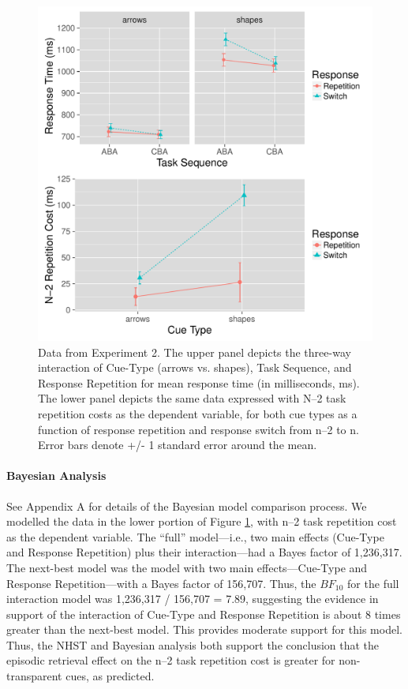 \documentclass[a4paper, doc, natbib]{apa6}
\begin{document}
\begin{figure}
\begin{center}
\includegraphics[width = \textwidth]{Images/all_rts_Experiment2.pdf}
\caption{Data from Experiment 2. The upper panel depicts the three-way interaction of Cue-Type (arrows vs. shapes), Task Sequence, and Response Repetition for mean response time (in milliseconds, ms). The lower panel depicts the same data expressed with N--2 task repetition costs as the dependent variable, for both cue types as a function of response repetition and response switch from n--2 to n. Error bars denote +/- 1 standard error around the mean.}
\label{fig:Experiment2}
\end{center}
\end{figure}

\paragraph{Bayesian Analysis}
See Appendix A for details of the Bayesian model comparison process. We modelled the data in the lower portion of Figure \ref{fig:Experiment2}, with n--2 task repetition cost as the dependent variable. The ``full'' model---i.e., two main effects (Cue-Type and Response Repetition) plus their interaction---had a Bayes factor of 1,236,317. The next-best model was the model with two main effects---Cue-Type and Response Repetition---with a Bayes factor of 156,707. Thus, the $BF_{10}$ for the full interaction model was 1,236,317 / 156,707 = 7.89, suggesting the evidence in support of the interaction of Cue-Type and Response Repetition is about 8 times greater than the next-best model. This provides moderate support for this model. Thus, the NHST and Bayesian analysis both support the conclusion that the episodic retrieval effect on the n--2 task repetition cost is greater for non-transparent cues, as predicted. 
\end{document}
